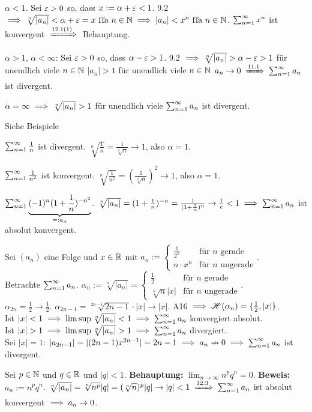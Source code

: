 \documentclass[a4paper,oneside,DIV15,BCOR12mm]{scrbook}
\begin{document}
\begin{beweise}
\item $\alpha < 1 $. Sei $\varepsilon>0$ so, dass $x:= \alpha+\varepsilon<1$. 9.2 $\implies \sqrt[n]{|a_n|} < \alpha + \varepsilon = x \text{ f\/fa } n\in\mathbb{N} \implies |a_n| < x^n \text{ f\/fa } n\in\mathbb{N}$. $\sum_{n=1}^{\infty}{x^n}$ ist konvergent $\folgtnach{12.1(1)}$ Behauptung.
\item 
 \begin{liste}
 \item $\alpha>1$, $\alpha<\infty$: Sei $\varepsilon>0$ so, dass $\alpha-\varepsilon>1$. 9.2 $\implies \sqrt[n]{|a_n|}>\alpha-\varepsilon>1$ für unendlich viele $n\in\mathbb{N}$ \folgt $|a_n|>1$ für unendlich viele $n\in\mathbb{N}$ \folgt $a_n \to 0 \folgtnach{11.1} \reihe{a_n}$ ist divergent.
 \item $\alpha = \infty \implies \sqrt[n]{|a_n|} > 1$ für unendlich viele \natn {} $\sum_{n=1}^{\infty}{a_n}$ ist divergent.
 \end{liste}
\item Siehe Beispiele
\end{beweise}

\begin{beispiele}
\item $\sum_{n=1}^{\infty}{\frac{1}{n}}$ ist divergent. $\sqrt[n]{\frac{1}{n}} = \frac{1}{\sqrt[n]{n}} \to 1$, also $\alpha = 1$.
\item $\sum_{n=1}^{\infty}{\frac{1}{n^2}}$ ist konvergent. $\sqrt[n]{\frac{1}{n^2}} = (\frac{1}{\sqrt[n]{n}})^2 \to 1$, also $\alpha = 1$.
\item $\sum_{n=1}^{\infty}{\underbrace{(-1)^{n}(1+\frac{1}{n})^{-n^2}}_{=:a_n}}$. $\sqrt[n]{|a_n|} = (1+\frac{1}{n})^{-n} = \frac{1}{(1+\frac{1}{n})^n} \to \frac{1}{e} < 1 \implies \sum_{n=1}^{\infty}{a_n}$ ist absolut konvergent.
\item Sei $(a_n)$ eine Folge und $x\in\mathbb{R}$ mit $a_n:= \begin{cases}\frac{1}{2^n} & \text{für }n\text{ gerade} \\ n\cdot x^n & \text{für }n\text{ ungerade}\end{cases}$. \\
Betrachte $\sum_{n=1}^{\infty}{a_n}$. $\alpha_n := \sqrt[n]{|a_n|} = \begin{cases}\frac{1}{2} &\text{für }n\text{ gerade} \\ \sqrt[n]{n}|x| &\text{für }n\text{ ungerade}\end{cases}$. \\
$\alpha_{2n} = \frac{1}{2} \to \frac{1}{2}$. $\alpha_{2n-1} = \sqrt[2n-1]{2n-1}\cdot|x| \to |x|$. A16 $\implies \mathscr{H}(\alpha_n) = \{\frac{1}{2}, |x|\}$. \\
Ist $|x| < 1 \implies \limsup \sqrt[n]{|a_n|} < 1 \implies \sum_{n=1}^{\infty}{a_n}$ konvergiert absolut.\\
Ist $|x| > 1 \implies \limsup \sqrt[n]{|a_n|} > 1 \implies \sum_{n=1}^{\infty}{a_n}$ divergiert.\\
Sei $|x|=1$: $|a_{2n-1}| = | (2n-1)x^{2n-1}| = 2n-1 \implies a_n \nrightarrow 0 \implies \sum_{n=1}^{\infty}{a_n}$ ist divergent.
\item Sei $p\in\mathbb{N}$ und $q\in\mathbb{R}$ und $|q|<1$. \textbf{Behauptung:} $\lim_{n\to\infty} n^pq^n=0$. \textbf{Beweis:} $a_n := n^pq^n$. $\sqrt[n]{|a_n|} = \sqrt[n]{n^p}|q| = (\sqrt[n]{n})^p|q| \to |q|<1 \folgtnach{12.3} \reihe{a_n}$ ist absolut konvergent $\implies a_n \to 0$.
\end{beispiele}
\end{document}
